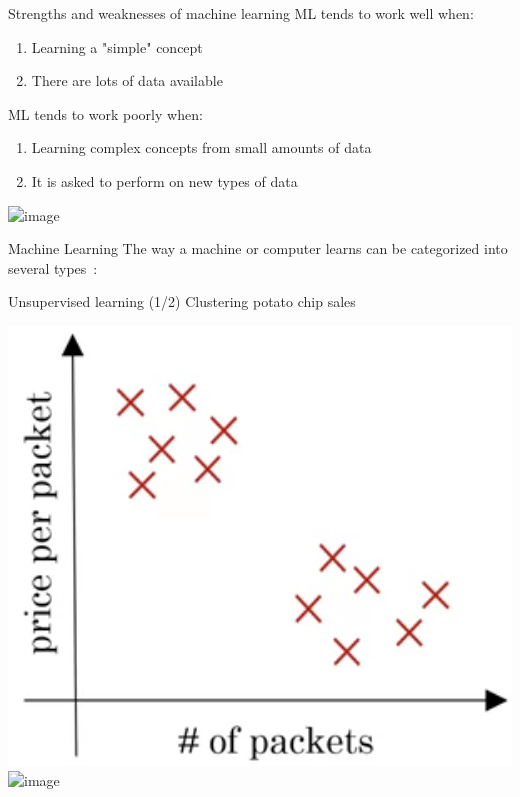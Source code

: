 \documentclass[pdf]{beamer}
\theoremstyle{mystyle}
\begin{document}
\begin{frame}{Strengths and weaknesses of machine learning}
	ML tends to work well when:
	\begin{enumerate}
		\item<2-> Learning a "simple" concept 
		\item<3-> There are lots of data available
	\end{enumerate}
	
	\bigskip	
	
	ML tends to work poorly when:
	\begin{enumerate}
		\item<4-> Learning complex concepts from small amounts of data
		\item<5-> It is asked to perform on new types of data
	\end{enumerate}
	\begin{center}
		\includegraphics<5->[scale=.275]{new-types-of-data}
	\end{center}
\end{frame}

\begin{frame}{Machine Learning}	
	The way a machine or computer learns can be categorized into several types~\citep{geron2019handson}:
	
\end{frame}

\begin{frame}{Unsupervised learning (1/2)}
	Clustering potato chip sales
	\begin{center}
		\includegraphics[scale=.25]{potato-chip-sales} \qquad \includegraphics<2->[scale=.25]{potato-chip-sales-2}
	\end{center}
	
\end{frame}
\end{document}
